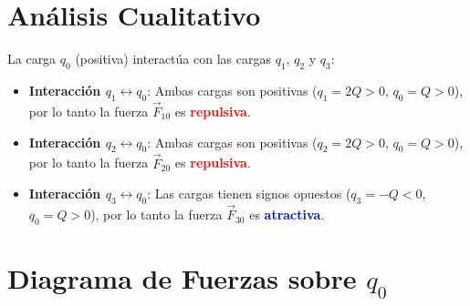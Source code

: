 \documentclass[12pt,letterpaper]{article}
\begin{document}
\section*{An\'alisis Cualitativo}

La carga $q_0$ (positiva) interact\'ua con las cargas $q_1$, $q_2$ y $q_3$:

\begin{itemize}
    \item \textbf{Interacci\'on $q_1 \leftrightarrow q_0$}: Ambas cargas son positivas ($q_1 = 2Q > 0$, $q_0 = Q > 0$), por lo tanto la fuerza $\vec{F}_{10}$ es \textcolor{red}{\textbf{repulsiva}}.

    \item \textbf{Interacci\'on $q_2 \leftrightarrow q_0$}: Ambas cargas son positivas ($q_2 = 2Q > 0$, $q_0 = Q > 0$), por lo tanto la fuerza $\vec{F}_{20}$ es \textcolor{red}{\textbf{repulsiva}}.

    \item \textbf{Interacci\'on $q_3 \leftrightarrow q_0$}: Las cargas tienen signos opuestos ($q_3 = -Q < 0$, $q_0 = Q > 0$), por lo tanto la fuerza $\vec{F}_{30}$ es \textcolor{blue}{\textbf{atractiva}}.
\end{itemize}

\section*{Diagrama de Fuerzas sobre $q_0$}
\end{document}
